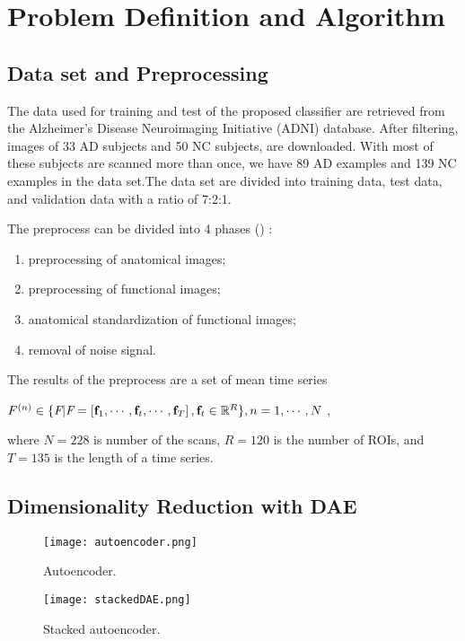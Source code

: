 \section{Problem Definition and Algorithm}

\subsection{Data set and Preprocessing}

The data used for training and test of the proposed classifier are retrieved from the Alzheimer's Disease Neuroimaging Initiative (ADNI) database. After filtering, images of 33 AD subjects and 50 NC subjects,  are downloaded. With most of these subjects are scanned more than once, we have 89 AD examples and 139 NC examples in the data set.The data set are divided into training data, test data, and validation data with a ratio of 7:2:1.

The preprocess can be divided into 4 phases (\cite{suk16}) :
	\begin{enumerate}
	\item preprocessing of anatomical images;
	\item  preprocessing of functional images;
	\item anatomical standardization of functional images;
	\item removal of noise signal.
	\end{enumerate}

The results of the preprocess are a set of mean time series 
\begin{center}
$ F^{(n)} \in \{ \emph{F} | \emph{F} = \left[ \textbf{f}_1, \cdots, \textbf{f}_t, \cdots, \textbf{f}_T \right],  \textbf{f}_t \in  \mathbb{R}^{R} \}, n=1,  \cdots, N$ ,
\end{center}
where $N=228$ is number of the scans, $R=120$ is the number of  ROIs, and $T=135$ is the length of a time series. 

\subsection{Dimensionality Reduction with DAE}

\begin{figure}[htb!]
    \centering
    \texttt{[image: autoencoder.png]}
    \caption{Autoencoder.}
    \label{fig:awesome_image}
\end{figure}
\begin{figure}[htb!]
    \centering
    \texttt{[image: stackedDAE.png]}
    \caption{Stacked autoencoder.}
    \label{fig:awesome_image}
\end{figure}

